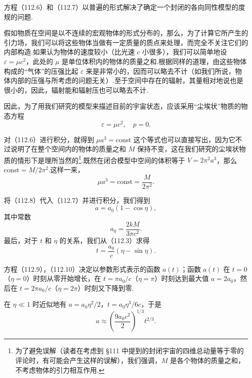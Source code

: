 方程（112.6）和（112.7）以普遍的形式解决了确定一个封闭的各向同性模型的度规的问题.

假如物质在空间是以不连续的宏观物体的形式分布的，那么，为了计算它所产生的引力场，我们可以将这些物体当做有一定质量的质点来处理，而完全不关注它们的内部构造.如果认为物体的速度较小（比光速 $c$ 小很多），我们可以简单地设 $\varepsilon=\mu c^{2}$，此处的 $\mu$ 是单位体积内的物体的质量之和.根据同样的道理，由这些物体构成的“气体”的压强比起 $\varepsilon$ 来是非常小的，因而可以略去不计（如我们所说，物体内部的压强与所考虑的问题无关）.至于空间中存在的辐射，其量相对地说也是很小的，因此，辐射能和辐射压也可以略去不计.

因此，为了用我们研究的模型来描述目前的宇宙状态，应该采用“尘埃状”物质的物态方程
\begin{equation*}
  \varepsilon=\mu c^{2},\quad p=0.
\end{equation*}

对（112.6）进行积分，就得到 $\mu a^{3}=\mathrm{const}$ 这个等式也可以直接写出，因为它不过说明了在整个空间内的物体的质量之和 $M$ 保持不变，这在我们研究的尘埃状物质的情形下是理所当然的\footnote{为了避免误解（读者在考虑到 §111 中提到的封闭宇宙的四维总动量等于零的评论时，有可能会产生这样的误解），我们强调，$M$ 是各个物体的质量之和，不考虑物体的引力相互作用.}.既然在闭合模型中空间的体积等于 $V=2\pi^{2}a^{3}$，那么 $\mathrm{const}=M/2\pi^{2}$.这样一来，
\begin{equation}
  \mu a^{3}=\mathrm{const}=\frac{M}{2\pi^{2}}.
\end{equation}

将（112.8）代入（112.7）并进行积分，我们得到
\begin{equation}
  a=a_{0}(1-\cos\eta),
\end{equation}
其中常数
\begin{equation*}
  a_{0}=\frac{2kM}{3\pi c^{2}}.
\end{equation*}
最后，对于 $t$ 和 $\eta$ 的关系，我们从（112.3）求得
\begin{equation}
  t=\frac{a_{0}}{c}(\eta-\sin\eta).
\end{equation}

方程（112.9），（112.10）决定以参数形式表示的函数 $a(t)$；函数 $a(t)$ 在 $t=0$（$\eta=0$）时刻从零开始增长，在 $t=\pi a_{0}/c$（$\eta=\pi$）时刻达到最大值 $a=2a_{0}$，然后在 $t=2\pi a_{0}/c$（$\eta=2\pi$）时刻又下降到零.

在 $\eta\ll1$ 时近似地有 $a=a_{0}\eta^{2}/2$，$t=a_{0}\eta^{3}/6c$，于是
\begin{equation}
  a\approx\left(\frac{9a_{0}c^{2}}{2}\right)^{1/3}t^{2/3}.
\end{equation}


